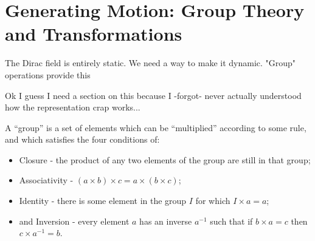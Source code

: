 %
%            
%
%
%
%
%
%            
%



\section{Generating Motion: Group Theory and Transformations}

    The Dirac field is entirely static. We need a way to make it dynamic. "Group" operations provide this
    
    Ok I guess I need a section on this because I -forgot- never actually understood how the representation crap works...

    A ``group'' is a set of elements which can be ``multiplied'' according to some rule,
        and which satisfies the four conditions of:
            \begin{itemize}
                \item Closure - the product of any two elements of the group are still in that group;
                \item Associativity - $(a \times b)\times c = a\times(b \times c)$;
                \item Identity - there is some element in the group $I$ for which $I \times a=a$;
                \item and Inversion - every element $a$ has an inverse $a^{-1}$ such that if $b \times a = c$ then $c \times a^{-1} = b$.
            \end{itemize}

